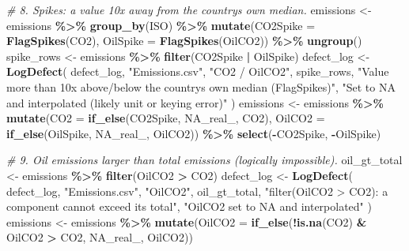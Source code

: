 \documentclass[
]{article}
\newenvironment{Shaded}{\begin{snugshade}}{\end{snugshade}}
\newcommand{\AttributeTok}[1]{\textcolor[rgb]{0.13,0.29,0.53}{#1}}
\newcommand{\CommentTok}[1]{\textcolor[rgb]{0.56,0.35,0.01}{\textit{#1}}}
\newcommand{\ConstantTok}[1]{\textcolor[rgb]{0.56,0.35,0.01}{#1}}
\newcommand{\FunctionTok}[1]{\textcolor[rgb]{0.13,0.29,0.53}{\textbf{#1}}}
\newcommand{\NormalTok}[1]{#1}
\newcommand{\OtherTok}[1]{\textcolor[rgb]{0.56,0.35,0.01}{#1}}
\newcommand{\SpecialCharTok}[1]{\textcolor[rgb]{0.81,0.36,0.00}{\textbf{#1}}}
\newcommand{\StringTok}[1]{\textcolor[rgb]{0.31,0.60,0.02}{#1}}
\begin{document}
\begin{Shaded}
\begin{Highlighting}[]
\CommentTok{\# 8. Spikes: a value 10x away from the country\textquotesingle{}s own median.}
\NormalTok{emissions }\OtherTok{\textless{}{-}}\NormalTok{ emissions }\SpecialCharTok{\%\textgreater{}\%}
  \FunctionTok{group\_by}\NormalTok{(ISO) }\SpecialCharTok{\%\textgreater{}\%}
  \FunctionTok{mutate}\NormalTok{(}\AttributeTok{CO2Spike =} \FunctionTok{FlagSpikes}\NormalTok{(CO2), }\AttributeTok{OilSpike =} \FunctionTok{FlagSpikes}\NormalTok{(OilCO2)) }\SpecialCharTok{\%\textgreater{}\%}
  \FunctionTok{ungroup}\NormalTok{()}
\NormalTok{spike\_rows }\OtherTok{\textless{}{-}}\NormalTok{ emissions }\SpecialCharTok{\%\textgreater{}\%} \FunctionTok{filter}\NormalTok{(CO2Spike }\SpecialCharTok{|}\NormalTok{ OilSpike)}
\NormalTok{defect\_log }\OtherTok{\textless{}{-}} \FunctionTok{LogDefect}\NormalTok{(}
\NormalTok{  defect\_log, }\StringTok{"Emissions.csv"}\NormalTok{, }\StringTok{"CO2 / OilCO2"}\NormalTok{, spike\_rows,}
  \StringTok{"Value more than 10x above/below the country\textquotesingle{}s own median (FlagSpikes)"}\NormalTok{,}
  \StringTok{"Set to NA and interpolated (likely unit or keying error)"}
\NormalTok{)}
\NormalTok{emissions }\OtherTok{\textless{}{-}}\NormalTok{ emissions }\SpecialCharTok{\%\textgreater{}\%}
  \FunctionTok{mutate}\NormalTok{(}\AttributeTok{CO2 =} \FunctionTok{if\_else}\NormalTok{(CO2Spike, }\ConstantTok{NA\_real\_}\NormalTok{, CO2),}
         \AttributeTok{OilCO2 =} \FunctionTok{if\_else}\NormalTok{(OilSpike, }\ConstantTok{NA\_real\_}\NormalTok{, OilCO2)) }\SpecialCharTok{\%\textgreater{}\%}
  \FunctionTok{select}\NormalTok{(}\SpecialCharTok{{-}}\NormalTok{CO2Spike, }\SpecialCharTok{{-}}\NormalTok{OilSpike)}

\CommentTok{\# 9. Oil emissions larger than total emissions (logically impossible).}
\NormalTok{oil\_gt\_total }\OtherTok{\textless{}{-}}\NormalTok{ emissions }\SpecialCharTok{\%\textgreater{}\%} \FunctionTok{filter}\NormalTok{(OilCO2 }\SpecialCharTok{\textgreater{}}\NormalTok{ CO2)}
\NormalTok{defect\_log }\OtherTok{\textless{}{-}} \FunctionTok{LogDefect}\NormalTok{(}
\NormalTok{  defect\_log, }\StringTok{"Emissions.csv"}\NormalTok{, }\StringTok{"OilCO2"}\NormalTok{, oil\_gt\_total,}
  \StringTok{"filter(OilCO2 \textgreater{} CO2): a component cannot exceed its total"}\NormalTok{,}
  \StringTok{"OilCO2 set to NA and interpolated"}
\NormalTok{)}
\NormalTok{emissions }\OtherTok{\textless{}{-}}\NormalTok{ emissions }\SpecialCharTok{\%\textgreater{}\%}
  \FunctionTok{mutate}\NormalTok{(}\AttributeTok{OilCO2 =} \FunctionTok{if\_else}\NormalTok{(}\SpecialCharTok{!}\FunctionTok{is.na}\NormalTok{(CO2) }\SpecialCharTok{\&}\NormalTok{ OilCO2 }\SpecialCharTok{\textgreater{}}\NormalTok{ CO2, }\ConstantTok{NA\_real\_}\NormalTok{, OilCO2))}


\end{Highlighting}
\end{Shaded}
\end{document}
